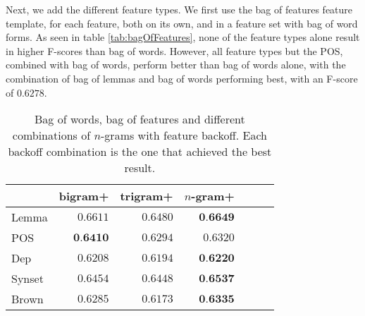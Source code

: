 \documentclass[11pt,letterpaper]{article}
\begin{document}
Next, we add the different feature types. We first use the bag of features feature template, for each feature, both on its own, and in a feature set with bag of word forms. As seen in table \ref{tab:bagOfFeatures}, none of the feature types alone result in higher F-scores than bag of words. However, all feature types but the POS, combined with bag of words, perform better than bag of words alone, with the combination of bag of lemmas and bag of words performing best, with an F-score of $0.6278$.

\begin{table}
  \begin{center}
    \begin{tabular}{lrrrrrr}
      \toprule

      & bigram+ & trigram+ & $n$-gram+ \\
      \midrule
      Lemma & $0.6611$ & $0.6480$ &  $\textbf{0.6649}$ \\ 
      POS & $\textbf{0.6410}$ & $0.6294$ & $0.6320$ \\
      Dep & $0.6208$ & $0.6194$ & $\textbf{0.6220}$ \\
      Synset & $0.6454$ & $0.6448$ &  $\textbf{0.6537}$\\
      Brown & $0.6285$ &  $0.6173$  & $\textbf{0.6335}$\\
      
      
      \bottomrule

    \end{tabular}
  \end{center}
  \caption{Bag of words, bag of features and different combinations of $n$-grams with feature backoff. Each backoff combination is the one that achieved the best result.}
  \label{tab:ngrambackoff}
\end{table}
\end{document}
